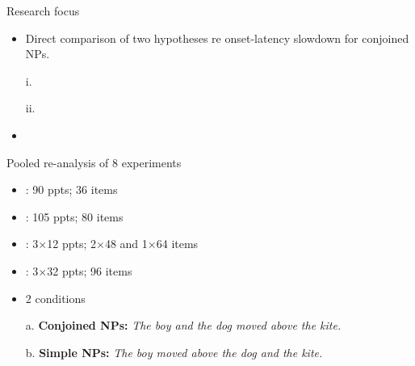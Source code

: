
\begin{frame}{Research focus}

\begin{itemize}
	\item Direct comparison of two hypotheses re onset-latency slowdown for conjoined NPs.
	\item[i.] 
	\item[ii.]  
	\item {}

\end{itemize}

\end{frame}


\begin{frame}{Pooled re-analysis of 8 experiments}



\begin{itemize}
	\item \textcite{hardy2019age}: 90 ppts; 36 items
	\item \textcite{hardy2020healthy}: 105 ppts; 80 items
	\item \textcite{martin2010planning}: 3$\times$12 ppts; 2$\times$48 and 1$\times$64 items
	\item \textcite{roeser2019advance}: 3$\times$32 ppts; 96 items 
\end{itemize}

\vfill 
\begin{itemize}
	\item 2 conditions
	\item[a.] \textbf{Conjoined NPs:} \textit{The boy and the dog moved above the kite.}
	\item[b.] \textbf{Simple NPs:} \textit{The boy moved above the dog and the kite.}
\end{itemize}


\end{frame}




